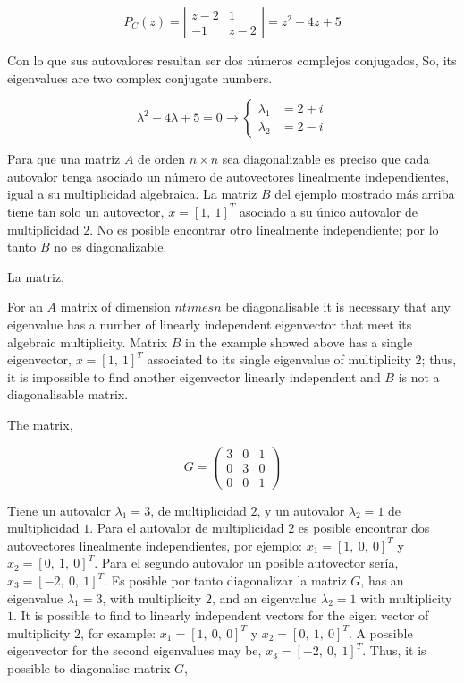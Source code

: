 \begin{equation*}
P_C(z)=\left\vert\begin{matrix}
z-2& 1\\
-1& z-2 
\end{matrix} \right\vert=z^2-4z+5
\end{equation*}
\begin{paracol}{2}
Con lo que sus autovalores resultan ser dos números complejos conjugados,
\switchcolumn
So, its eigenvalues are two complex conjugate numbers.
\end{paracol}
\begin{equation*}
\lambda^2-4\lambda+5=0 \rightarrow \left\{ 
\begin{aligned}
\lambda_1&=2+i\\
\lambda_2&=2-i
\end{aligned}
\right.
\end{equation*}
\begin{paracol}{2}
Para que una matriz $A$ de orden $n\times n$ sea diagonalizable es preciso que cada autovalor tenga asociado un número de autovectores linealmente independientes, igual a su multiplicidad algebraica. La matriz $B$ del ejemplo mostrado más arriba tiene tan solo un autovector, $x=[1,\ 1]^T$ asociado a su único autovalor de multiplicidad $2$. No es posible encontrar otro linealmente independiente; por lo tanto $B$ no es diagonalizable. 

La matriz,

\switchcolumn
For an $A$ matrix of dimension $n times n$ be diagonalisable it is necessary that any eigenvalue has a number of linearly independent eigenvector that meet its algebraic multiplicity. Matrix $B$ in the example showed above has a single eigenvector, $x=[1,\ 1]^T$ associated to its single eigenvalue of multiplicity $2$; thus, it is impossible to find another eigenvector linearly independent and $B$ is not a diagonalisable matrix.

The matrix,  
\end{paracol}
\begin{equation*}
G=\begin{pmatrix}
3& 0& 1\\
0& 3& 0\\
0& 0& 1
\end{pmatrix}
\end{equation*}
\begin{paracol}{2}
Tiene un autovalor $\lambda_1=3$, de multiplicidad $2$, y un autovalor $\lambda_2=1$ de multiplicidad $1$. Para el autovalor de multiplicidad $2$ es posible encontrar dos autovectores linealmente independientes, por ejemplo: $x_1=[1,\ 0,\ 0]^T$ y $x_2=[0,\ 1,\ 0]^T$. Para el segundo autovalor un posible autovector sería, $x_3=[-2,\ 0,\ 1]^T$. Es posible por tanto diagonalizar la matriz $G$,
\switchcolumn
has an eigenvalue $\lambda_1=3$, with multiplicity $2$, and an eigenvalue $\lambda_2=1$ with multiplicity $1$. It is possible to find to linearly independent vectors for the eigen vector of multiplicity $2$, for example: $x_1=[1,\ 0,\ 0]^T$ y $x_2=[0,\ 1,\ 0]^T$. A possible eigenvector for the second eigenvalues may be, $x_3=[-2,\ 0,\ 1]^T$. Thus, it is possible to diagonalise matrix $G$,
\end{paracol}
